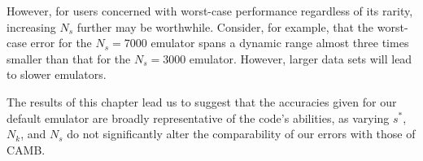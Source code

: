 However, for users concerned with worst-case performance regardless of its
rarity, increasing $N_s$ further may be worthwhile. Consider, for example,
that the worst-case error for the $N_s = 7000$ emulator spans a dynamic range
almost three times smaller than that for the $N_s = 3000$ emulator. However,
larger data sets will lead to slower emulators.

The results of this chapter lead us to suggest that the accuracies given for
our default emulator are broadly representative of the code's abilities, as
varying $s^*$, $N_k$, and $N_s$ do not significantly alter the comparability
of our errors with those of CAMB.
